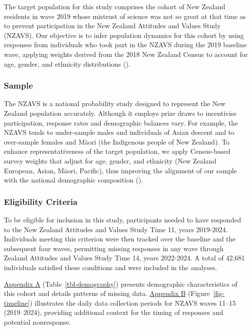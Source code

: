 \documentclass[
  single column]{article}
\begin{document}
The target population for this study comprises the cohort of New Zealand
residents in wave 2019 whose mistrust of science was not so great at
that time as to prevent participation in the New Zealand Attitudes and
Values Study (NZAVS). Our objective is to infer population dynamics for
this cohort by using responses from individuals who took part in the
NZAVS during the 2019 baseline wave, applying weights derived from the
2018 New Zealand Census to account for age, gender, and ethnicity
distributions ().

\subsubsection{Sample}\label{sample}

The NZAVS is a national probability study designed to represent the New
Zealand population accurately. Although it employs prize draws to
incentivise participation, response rates and demographic balances vary.
For example, the NZAVS tends to under-sample males and individuals of
Asian descent and to over-sample females and Māori (the Indigenous
people of New Zealand). To enhance representativeness of the target
population, we apply Census-based survey weights that adjust for age,
gender, and ethnicity (New Zealand European, Asian, Māori, Pacific),
thus improving the alignment of our sample with the national demographic
composition ().

\subsubsection{Eligibility Criteria}\label{eligibility-criteria}

To be eligible for inclusion in this study, participants needed to have
responded to the New Zealand Attitudes and Values Study Time 11, years
2019-2024. Individuals meeting this criterion were then tracked over the
baseline and the subsequent four waves, permitting missing responses in
any wave through Zealand Attitudes and Values Study Time 14, years
2022-2024. A total of 42,681 individuals satisfied these conditions and
were included in the analyses.

\hyperref[appendix-a]{Appendix A} (Table~\ref{tbl-demography}) presents
demographic characteristics of this cohort and details patterns of
missing data. \hyperref[appendix-b]{Appendix B}
(Figure~\ref{fig-timeline}) illustrates the daily data collection
periods for NZAVS waves 11--15 (2019--2024), providing additional
context for the timing of responses and potential nonresponse.
\end{document}
